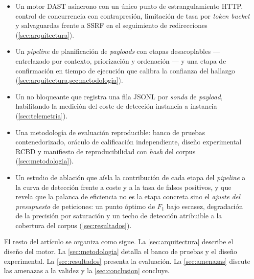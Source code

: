 \begin{itemize}
  \item Un motor DAST asíncrono con un único punto de estrangulamiento HTTP,
  control de concurrencia con contrapresión, limitación de tasa por
  \emph{token bucket} y salvaguardas frente a SSRF en el seguimiento de
  redirecciones (\cref{sec:arquitectura}).
  \item Un \emph{pipeline} de planificación de \emph{payloads} con etapas
  desacoplables --- entrelazado por contexto, priorización y ordenación --- y
  una etapa de confirmación en tiempo de ejecución que calibra la confianza
  del hallazgo (\cref{sec:arquitectura,sec:metodologia}).
  \item Un  no bloqueante que registra una fila JSONL
  por \emph{sonda} de \emph{payload}, habilitando la medición del coste de
  detección instancia a instancia (\cref{sec:telemetria}).
  \item Una metodología de evaluación reproducible: banco de pruebas
  contenedorizado, oráculo de calificación independiente, diseño experimental
  RCBD y manifiesto de reproducibilidad con \emph{hash} del corpus
  (\cref{sec:metodologia}).
  \item Un estudio de ablación que aísla la contribución de cada etapa del
  \emph{pipeline} a la curva de detección frente a coste y a la tasa de
  falsos positivos, y que revela que la palanca de eficiencia no es la etapa
  concreta sino el \emph{ajuste del presupuesto} de peticiones: un punto óptimo
  de $F_1$ bajo escasez, degradación de la precisión por saturación y un techo
  de detección atribuible a la cobertura del corpus (\cref{sec:resultados}).
\end{itemize}

El resto del artículo se organiza como sigue. La \cref{sec:arquitectura}
describe el diseño del motor. La \cref{sec:metodologia} detalla el banco de
pruebas y el diseño experimental. La \cref{sec:resultados} presenta la
evaluación. La \cref{sec:amenazas} discute las amenazas a la validez y la
\cref{sec:conclusion} concluye.
